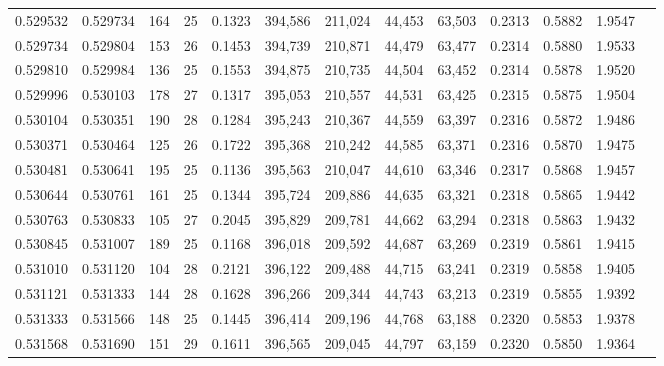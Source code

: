 \begin{tabular}{rrrrrrrrrrrrr}
0.529532 & 0.529734 &   164 &  25 &                                     0.1323 & 394,586 & 211,024 &  44,453 &  63,503 & 0.2313 & 0.5882 & 1.9547 \\
0.529734 & 0.529804 &   153 &  26 &                                     0.1453 & 394,739 & 210,871 &  44,479 &  63,477 & 0.2314 & 0.5880 & 1.9533 \\
0.529810 & 0.529984 &   136 &  25 &                                     0.1553 & 394,875 & 210,735 &  44,504 &  63,452 & 0.2314 & 0.5878 & 1.9520 \\
0.529996 & 0.530103 &   178 &  27 &                                     0.1317 & 395,053 & 210,557 &  44,531 &  63,425 & 0.2315 & 0.5875 & 1.9504 \\
0.530104 & 0.530351 &   190 &  28 &                                     0.1284 & 395,243 & 210,367 &  44,559 &  63,397 & 0.2316 & 0.5872 & 1.9486 \\
0.530371 & 0.530464 &   125 &  26 &                                     0.1722 & 395,368 & 210,242 &  44,585 &  63,371 & 0.2316 & 0.5870 & 1.9475 \\
0.530481 & 0.530641 &   195 &  25 &                                     0.1136 & 395,563 & 210,047 &  44,610 &  63,346 & 0.2317 & 0.5868 & 1.9457 \\
0.530644 & 0.530761 &   161 &  25 &                                     0.1344 & 395,724 & 209,886 &  44,635 &  63,321 & 0.2318 & 0.5865 & 1.9442 \\
0.530763 & 0.530833 &   105 &  27 &                                     0.2045 & 395,829 & 209,781 &  44,662 &  63,294 & 0.2318 & 0.5863 & 1.9432 \\
0.530845 & 0.531007 &   189 &  25 &                                     0.1168 & 396,018 & 209,592 &  44,687 &  63,269 & 0.2319 & 0.5861 & 1.9415 \\
0.531010 & 0.531120 &   104 &  28 &                                     0.2121 & 396,122 & 209,488 &  44,715 &  63,241 & 0.2319 & 0.5858 & 1.9405 \\
0.531121 & 0.531333 &   144 &  28 &                                     0.1628 & 396,266 & 209,344 &  44,743 &  63,213 & 0.2319 & 0.5855 & 1.9392 \\
0.531333 & 0.531566 &   148 &  25 &                                     0.1445 & 396,414 & 209,196 &  44,768 &  63,188 & 0.2320 & 0.5853 & 1.9378 \\
0.531568 & 0.531690 &   151 &  29 &                                     0.1611 & 396,565 & 209,045 &  44,797 &  63,159 & 0.2320 & 0.5850 & 1.9364 \\

\end{tabular}
